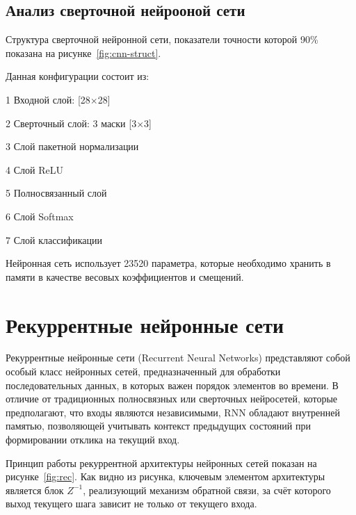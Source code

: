 \subsection{Анализ сверточной нейрооной сети}
\hspace*{12.5 mm}Структура сверточной нейронной сети, показатели точности 
которой 90\% показана на рисунке~\ref{fig:cnn-struct}\cite{CNN}.


Данная конфигурации состоит из: 

  1 Входной слой: [28$\times$28]

  2 Сверточный слой: 3 маски [3$\times$3] 

  3 Слой пакетной нормализации 

  4 Слой ReLU 

  5 Полносвязанный слой 

  6 Слой Softmax 

  7 Слой классификации

Нейронная сеть использует 23520 параметра, которые необходимо хранить в памяти 
в качестве весовых коэффициентов и смещений.

\section{Рекуррентные нейронные сети}
\hspace*{12.5 mm}Рекуррентные нейронные сети (Recurrent Neural Networks) 
представляют собой особый класс нейронных сетей, предназначенный для обработки 
последовательных данных, в которых важен порядок элементов во времени. В 
отличие от традиционных полносвязных или сверточных нейросетей, которые 
предполагают, что входы являются независимыми, RNN обладают внутренней памятью,
позволяющей учитывать контекст предыдущих состояний при формировании отклика на
текущий вход.

Принцип работы рекуррентной архитектуры нейронных сетей показан на 
рисунке~\ref{fig:rec}. Как видно из рисунка, ключевым элементом архитектуры 
является блок $Z^{-1}$, реализующий механизм обратной связи, за счёт 
которого выход текущего шага зависит не только от текущего входа.


